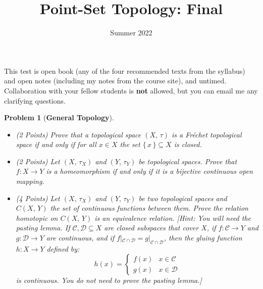 \documentclass{article}
\title{Point-Set Topology: Final}
\date{Summer 2022}
\theoremstyle{normal}
\newtheorem{problem}{Problem}
\begin{document}
    \maketitle
    This test is open book (any of the four recommended texts from the syllabus)
    and open notes (including my notes from the course site), and untimed.
    Collaboration with your fellow students is \textbf{not} allowed, but you
    can email me any clarifying questions.
    \begin{problem}[\textbf{General Topology}]
        \par\hfill\par\vspace{2em}
        \begin{itemize}
            \item
            (2 Points)
            Prove that a topological space $(X,\,\tau)$ is a
            Fr\'{e}chet topological space if and only if for all $x\in{X}$ the
            set $\{\,x\,\}\subseteq{X}$ is closed.
            \item
            (2 Points)
            Let $(X,\,\tau_{X})$ and $(Y,\,\tau_{Y})$ be topological spaces.
            Prove that $f:X\rightarrow{Y}$ is a homeomorphism if and only if
            it is a bijective continuous open mapping.
            \item
            (4 Points) Let $(X,\,\tau_{X})$ and $(Y,\,\tau_{Y})$ be two
            topological spaces and $C(X,\,Y)$ the set of continuous functions
            between them. Prove the relation \textit{homotopic} on $C(X,\,Y)$
            is an equivalence relation. [Hint: You will need the pasting lemma.
            If $\mathcal{C},\mathcal{D}\subseteq{X}$ are closed subspaces that
            cover $X$, if $f:\mathcal{C}\rightarrow{Y}$ and
            $g:\mathcal{D}\rightarrow{Y}$ are continuous, and if
            $f|_{\mathcal{C}\cap\mathcal{D}}=g|_{\mathcal{C}\cap\mathcal{D}}$,
            then the \textit{gluing} function $h:X\rightarrow{Y}$ defined by:
            \begin{equation}
                h(x)=
                \begin{cases}
                    f(x)&x\in\mathcal{C}\\
                    g(x)&x\in\mathcal{D}
                \end{cases}
            \end{equation}
            is continuous. You do not need to prove the pasting lemma.]
        \end{itemize}
    \end{problem}
\end{document}
